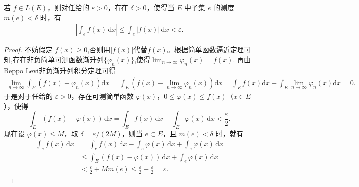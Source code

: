 \documentclass[../../main.tex]{subfiles}
\begin{document}
\begin{theorem}[积分的绝对连续性]\label{theorem:积分的绝对连续性}
若 $f \in L(E)$，则对任给的 $\varepsilon > 0$，存在 $\delta > 0$，使得当 $E$ 中子集 $e$ 的测度 $m(e) < \delta$ 时，有
\begin{align*}
\left| \int_e f(x) \, \mathrm{d}x \right| \leqslant \int_e |f(x)| \, \mathrm{d}x < \varepsilon.
\end{align*}
\end{theorem}
\begin{proof}
不妨假定 $f(x) \geqslant 0$,否则用$|f(x)|$代替$f(x)$。根据\hyperref[theorem:简单函数逼近定理]{简单函数逼近定理}可知,存在非负简单可测函数渐升列$\{\varphi_n(x)\}$,使得$\lim_{n\to \infty}\varphi_n(x)=f(x).$
再由\hyperref[theorem:Beppo Levi非负渐升列积分定理]{Beppo Levi非负渐升列积分定理}可得
\begin{align*}
\underset{n\rightarrow \infty}{\lim}\int_E{\left( f\left( x \right) -\varphi _n\left( x \right) \right) \mathrm{d}x}=\,\int_E{\left( f\left( x \right) -\underset{n\rightarrow \infty}{\lim}\varphi _n\left( x \right) \right) \mathrm{d}x}=\int_E{f\left( x \right) \mathrm{d}x}-\int_E{\underset{n\rightarrow \infty}{\lim}\varphi _n\left( x \right) \mathrm{d}x}=0.
\end{align*}
于是对于任给的 $\varepsilon > 0$，存在可测简单函数 $\varphi(x)$，$0 \leqslant \varphi(x) \leqslant f(x)$（$x \in E$），使得
\[
\int_E (f(x) - \varphi(x)) \, \mathrm{d}x = \int_E f(x) \, \mathrm{d}x - \int_E \varphi(x) \, \mathrm{d}x < \frac{\varepsilon}{2}.
\]
现在设 $\varphi(x) \leqslant M$，取 $\delta = \varepsilon / (2M)$，则当 $e \subset E$，且 $m(e) < \delta$ 时，就有
\begin{align*}
\int_e f(x) \, \mathrm{d}x &= \int_e f(x) \, \mathrm{d}x - \int_e \varphi(x) \, \mathrm{d}x + \int_e \varphi(x) \, \mathrm{d}x \\
&\leqslant \int_E (f(x) - \varphi(x)) \, \mathrm{d}x + \int_e \varphi(x) \, \mathrm{d}x \\
&< \frac{\varepsilon}{2} + Mm(e) \leqslant \frac{\varepsilon}{2} + \frac{\varepsilon}{2} = \varepsilon.
\end{align*}
\end{proof}
\end{document}
